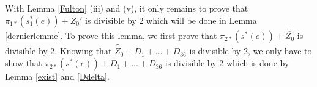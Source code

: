 \documentclass{alggeom}
\newcommand{\Z}{\mathbb{Z}}
\theoremstyle{plain}
\theoremstyle{definition}
\theoremstyle{remark}
\begin{document}
With Lemma \ref{Fulton} (iii) and (v), it only remains to prove that $\pi_{1*}(s_{1}^{*}(e))+\overline{Z_{0}}'$ is divisible by 2 which will be done in Lemma \ref{dernierlemme}. To prove this lemma, we first prove that $\pi_{2*}(s^{*}(e))+\widetilde{\overline{Z_{0}}}$ is divisible by 2. Knowing that $\widetilde{\overline{Z_0}}+D_{1}+...+D_{36}$ is divisible by 2, we only have to show that $\pi_{2*}(s^{*}(e))+D_{1}+...+D_{36}$ is divisible by 2 which is done by Lemma \ref{exist} and \ref{Ddelta}.
\end{document}

